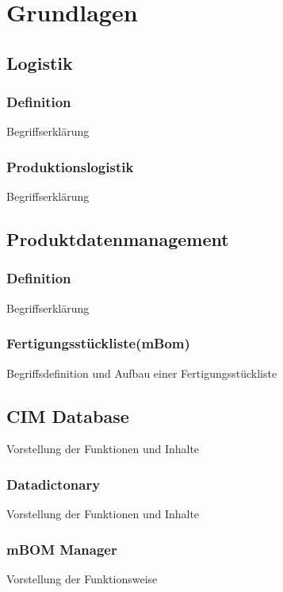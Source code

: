 \chapter{Grundlagen}

\section{Logistik}
\subsection{Definition}
Begriffserklärung

\subsection{Produktionslogistik}
Begriffserklärung 

\section{Produktdatenmanagement}
\subsection{Definition}
Begriffserklärung 

\subsection{Fertigungsstückliste(mBom)}
Begriffsdefinition und Aufbau einer Fertigungsstückliste

\section{CIM Database}
Vorstellung der Funktionen und Inhalte

\subsection{Datadictonary}
Vorstellung der Funktionen und Inhalte

\subsection{mBOM Manager}
Vorstellung der Funktionsweise